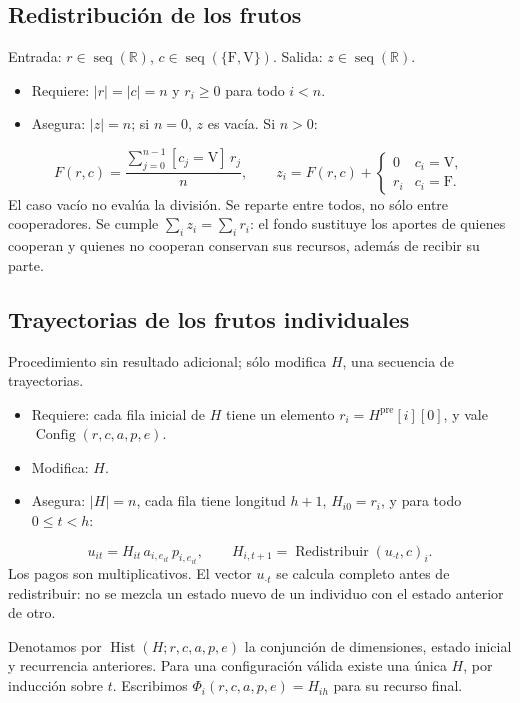 \documentclass[11pt,a4paper]{article}
\newcommand{\R}{\mathbb R}
\newcommand{\Bool}{\{\mathrm F,\mathrm V\}}
\newcommand{\len}[1]{\lvert #1\rvert}
\newcommand{\pre}{^{\mathrm{pre}}}
\begin{document}
\subsection{Redistribución de los frutos}
Entrada: $r\in\operatorname{seq}(\R)$, $c\in\operatorname{seq}(\Bool)$.
Salida: $z\in\operatorname{seq}(\R)$.
\begin{itemize}
\item Requiere: $\len{r}=\len{c}=n$ y $r_i\geq0$ para todo $i<n$.
\item Asegura: $\len{z}=n$; si $n=0$, $z$ es vacía. Si $n>0$:
\end{itemize}
\[
 F(r,c)=\frac{\sum_{j=0}^{n-1}[c_j=\mathrm V]\,r_j}{n},
 \qquad
 z_i=F(r,c)+
 \begin{cases}0&c_i=\mathrm V,\\r_i&c_i=\mathrm F.\end{cases}
\]
El caso vacío no evalúa la división. Se reparte entre todos, no sólo
entre cooperadores. Se cumple
$\sum_i z_i=\sum_i r_i$: el fondo sustituye los aportes de quienes cooperan
y quienes no cooperan conservan sus recursos, además de recibir su parte.

\begin{samepage}
\subsection{Trayectorias de los frutos individuales}
Procedimiento sin resultado adicional; sólo modifica $H$, una secuencia
de trayectorias.
\begin{itemize}
\item Requiere: cada fila inicial de $H$ tiene un elemento $r_i=H\pre[i][0]$,
      y vale $\operatorname{Config}(r,c,a,p,e)$.
\item Modifica: $H$.
\item Asegura: $\len{H}=n$, cada fila tiene longitud $h+1$,
      $H_{i0}=r_i$, y para todo $0\leq t<h$:
\end{itemize}
\[
 u_{it}=H_{it}\,a_{i,e_{it}}\,p_{i,e_{it}},
 \qquad H_{i,t+1}=\operatorname{Redistribuir}(u_{\cdot t},c)_i.
\]
Los pagos son multiplicativos. El vector $u_{\cdot t}$ se calcula completo
antes de redistribuir: no se mezcla un estado nuevo de un individuo con
el estado anterior de otro.

Denotamos por $\operatorname{Hist}(H;r,c,a,p,e)$ la conjunción de
dimensiones, estado inicial y recurrencia anteriores. Para una configuración
válida existe una única $H$, por inducción sobre $t$. Escribimos
$\Phi_i(r,c,a,p,e)=H_{ih}$ para su recurso final.
\end{samepage}
\end{document}
